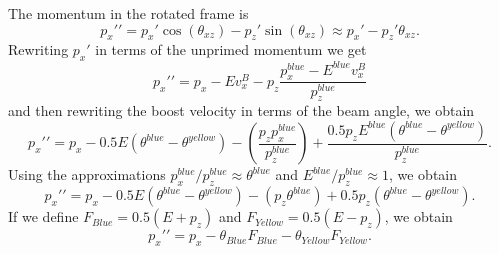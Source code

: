 \documentclass[12pt,oneside,openary]{article}
\begin{document}
The momentum in the rotated frame is
\begin{equation}
p_{x}\prime\prime = p_{x}\prime \cos(\theta_{xz})- p_{z}\prime \sin(\theta_{xz})\approx p_{x}\prime - p_z\prime \theta_{xz}.
\end{equation}
Rewriting $p_x\prime$ in terms of the unprimed momentum we get
\begin{equation}
p_{x}\prime\prime = p_{x} - E v^{B}_x - p_z \frac{p^{blue}_x - E^{blue} v^{B}_x}{p^{blue}_z}
\end{equation}
and then rewriting the boost velocity in terms of the beam angle, we obtain
\begin{equation}
p_{x}\prime\prime = p_{x} - 0.5 E (\theta^{blue}-\theta^{yellow}) - \left(\frac{p_z p^{blue}_x}{p^{blue}_z}\right)+\frac{0.5 p_{z}E^{blue}(\theta^{blue}-\theta^{yellow})}{p^{blue}_z}.
\end{equation}
Using the approximations $p^{blue}_x/p^{blue}_z \approx \theta^{blue}$ and $E^{blue}/p^{blue}_z \approx 1$,
we obtain
\begin{equation}
p_{x}\prime\prime = p_{x} -  0.5E(\theta^{blue}-\theta^{yellow}) - (p_z \theta^{blue})+0.5 p_{z} (\theta^{blue}-\theta^{yellow}).
\end{equation}
If we define $F_{Blue} = 0.5(E+p_z)$
and 
$F_{Yellow} = 0.5(E-p_z)$,
we obtain
\begin{equation}
p_{x}\prime\prime = p_{x} -\theta_{Blue}F_{Blue} - \theta_{Yellow}F_{Yellow}.
\end{equation}
\end{document}
